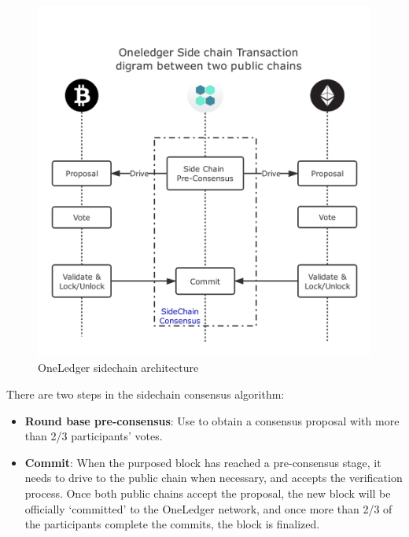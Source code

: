         \begin{figure}[H]
        \includegraphics[width=1\textwidth]{./figures/oneledger.png}
        \centering
        \caption{{OneLedger sidechain architecture}\protect\footnotemark}
        \centering
        \label{fig:oneledger}
        
        \end{figure}
\noindent There are two steps in the sidechain consensus algorithm:
\begin{itemize}
    \item \textbf{Round base pre-consensus}: Use to obtain a consensus proposal with more than 2/3 participants' votes.
    \item \textbf{Commit}: When the purposed block has reached a pre-consensus stage, it needs to drive to the public chain when necessary, and accepts the verification process. Once both public chains accept the proposal, the new block will be officially `committed' to the OneLedger network, and once more than 2/3 of the participants complete the commits, the block is finalized. 
\end{itemize}
